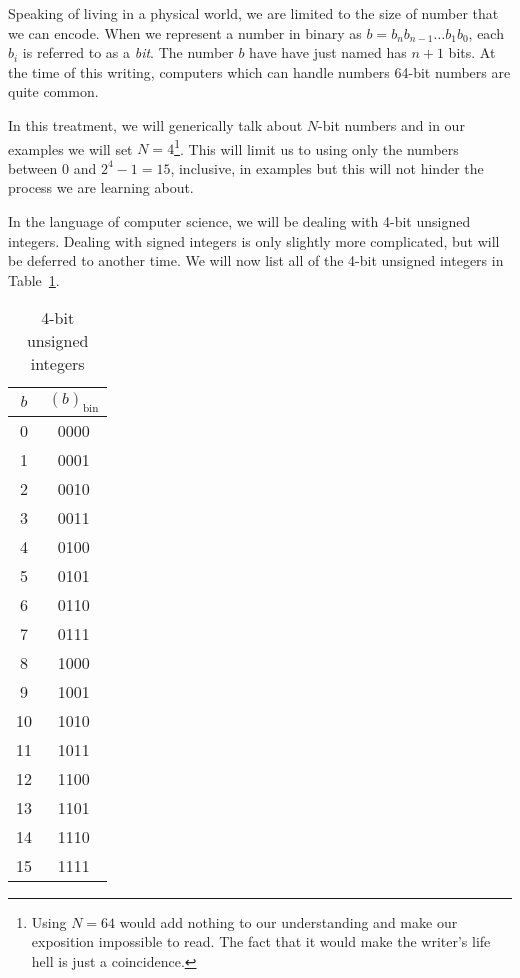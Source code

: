 Speaking of living in a physical world, we are limited to the size of number that we can encode.  When we represent a number in binary as $b=b_nb_{n-1}\dots b_1b_0$, each $b_i$ is referred to as a \emph{bit}.  The number $b$ have have just named has $n+1$ bits.  At the time of this writing, computers which can handle numbers 64-bit numbers are quite common.

In this treatment, we will generically talk about $N$-bit numbers and in our examples we will set $N=4$\footnote{Using $N=64$ would add nothing to our understanding and make our exposition impossible to read.  The fact that it would make the writer's life hell is just a coincidence.}.  This will limit us to using only the numbers between 0 and $2^4-1 = 15$, inclusive, in examples but this will not hinder the process we are learning about.

In the language of computer science, we will be dealing with 4-bit unsigned integers.  Dealing with signed integers is only slightly more complicated, but will be deferred to another time.  We will now list all of the 4-bit unsigned integers in Table~\ref{table:4-bit_unsigned_integers}.

\begin{table}\label{table:4-bit_unsigned_integers}
	\begin{center}
		\begin{tabular}{cc} 
			$b$ & $(b)_\text{bin}$ \\  \hline 
			0 & 0000 \\  
			1 & 0001  \\  
			2 & 0010  \\  
			3 & 0011  \\  
			4 & 0100 \\  
			5 & 0101 \\  
			6 & 0110  \\  
			7 & 0111  \\
			8 & 1000  \\  
			9 & 1001  \\
			10 & 1010  \\
			11 & 1011  \\
			12 & 1100  \\
			13 & 1101  \\
			14 & 1110  \\
			15 & 1111  \\
		\end{tabular}
	\end{center}
\caption{4-bit unsigned integers}
\end{table}

